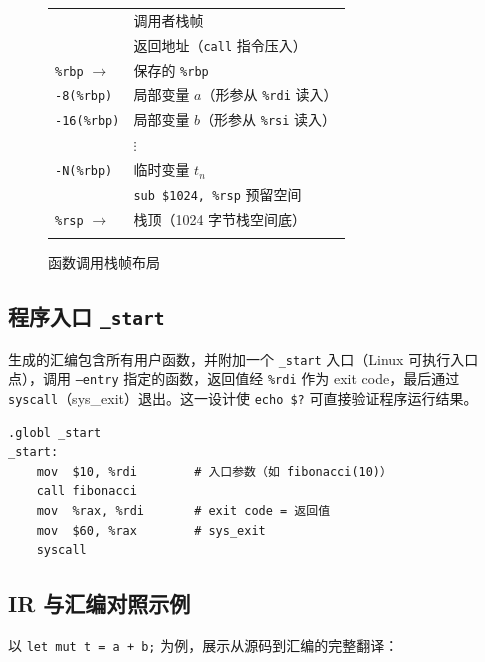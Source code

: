 \documentclass[12pt,a4paper]{ctexart}
\begin{document}
\begin{figure}[H]
\centering
\renewcommand{\arraystretch}{1.35}
\begin{tabular}{|>{\raggedright\arraybackslash}p{2.8cm}|l|}
\hline
\multicolumn{2}{|c|}{\textbf{高地址} $\uparrow$} \\
\hline
 & 调用者栈帧 \\
\hline
 & 返回地址（\texttt{call} 指令压入） \\
\hline
\texttt{\%rbp} $\rightarrow$ & 保存的 \texttt{\%rbp} \\
\hline
\texttt{-8(\%rbp)} & 局部变量 $a$（形参从 \texttt{\%rdi} 读入） \\
\hline
\texttt{-16(\%rbp)} & 局部变量 $b$（形参从 \texttt{\%rsi} 读入） \\
\hline
 & $\vdots$ \\
\hline
\texttt{-N(\%rbp)} & 临时变量 $t_n$ \\
\hline
 & \texttt{sub \$1024, \%rsp} 预留空间 \\
\hline
\texttt{\%rsp} $\rightarrow$ & 栈顶（1024 字节栈空间底） \\
\hline
\multicolumn{2}{|c|}{\textbf{低地址} $\downarrow$} \\
\hline
\end{tabular}
\caption{函数调用栈帧布局}
\end{figure}

\subsection{程序入口 \texttt{\_start}}

生成的汇编包含所有用户函数，并附加一个 \texttt{\_start} 入口（Linux 可执行入口点），调用 \texttt{--entry} 指定的函数，返回值经 \texttt{\%rdi} 作为 exit code，最后通过 \texttt{syscall}（sys\_exit）退出。这一设计使 \texttt{echo \$?} 可直接验证程序运行结果。

\begin{lstlisting}[language=ATnT, caption={\_start 入口（运行验证用）}]
    .globl _start
_start:
    mov  $10, %rdi        # 入口参数（如 fibonacci(10)）
    call fibonacci
    mov  %rax, %rdi       # exit code = 返回值
    mov  $60, %rax        # sys_exit
    syscall
\end{lstlisting}

\subsection{IR 与汇编对照示例}

以 \texttt{let mut t = a + b;} 为例，展示从源码到汇编的完整翻译：
\end{document}
